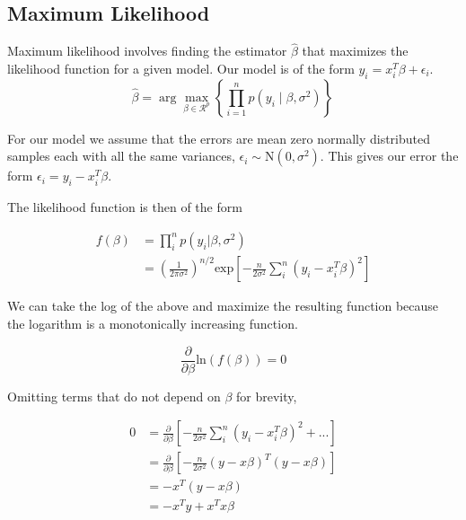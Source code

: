 \documentclass[12pt]{article}
\begin{document}
        \subsection*{Maximum Likelihood}

        Maximum likelihood involves finding the estimator $\hat{\beta}$ that maximizes the likelihood function for a given model. Our model is of the form $y_i = x_i^T \beta + \epsilon_i$.
        \begin{equation}
            \hat{\beta} = \arg \max_{\beta \in \mathcal{R}^p} \left\{ \prod_{i=1}^n p(y_i \mid \beta, \sigma^2) \right\} \,
        \end{equation}

        For our model we assume that the errors are mean zero normally distributed samples each with all the same variances, $\epsilon_i \sim \text{N}(0, \sigma^2)$. This gives our error the form $\epsilon_i = y_i - x_i^T \beta$. 

        The likelihood function is then of the form

        \begin{align}
            f(\beta) &= \prod_i^n p(y_i|\beta, \sigma^2) \\
             &= \left( \frac{1}{2 \pi \sigma^2}\right)^{n/2} \text{exp}\left [ -\frac{n}{2\sigma^2} \sum_i^n(y_i - x_i^T \beta)^2 \right]
        \end{align}

        We can take the log of the above and maximize the resulting function because the logarithm is a monotonically increasing function. 

        \begin{equation}
            \frac{\partial}{\partial \beta}\text{ln}(f(\beta)) = 0
        \end{equation}

        Omitting terms that do not depend on $\beta$ for brevity,

        \begin{align}
            0 & = \frac{\partial}{\partial \beta}\left [ - \frac{n}{2 \sigma^2}\sum_i^n(y_i - x_i^T \beta)^2 + ...\right] \\
            & = \frac{\partial}{\partial \beta}\left [ - \frac{n}{2 \sigma^2} (y - x\beta)^T(y-x\beta) \right ] \\
            & = -x^T (y-x\beta)\\
            & = -x^T y + x^T x \beta
        \end{align}
\end{document}
